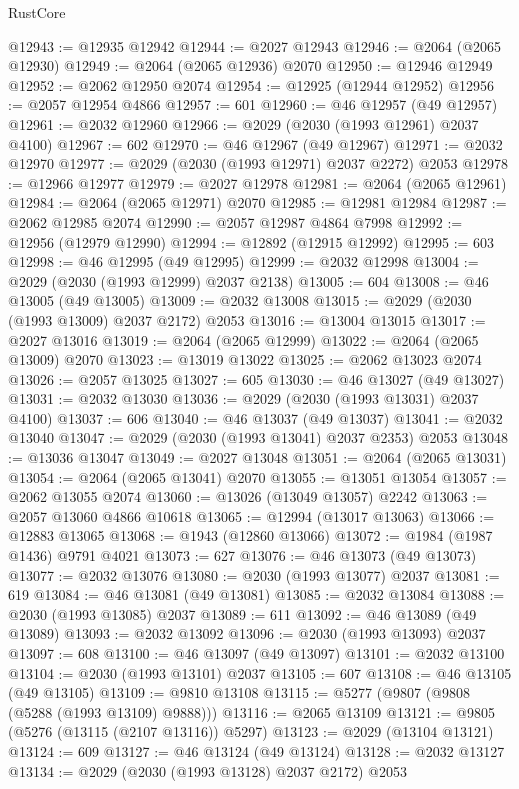 \begin{lexlean}{RustCore}
\begin{coremodule}
@12943 := @12935 @12942
@12944 := @2027 @12943
@12946 := @2064 (@2065 @12930)
@12949 := @2064 (@2065 @12936) @2070
@12950 := @12946 @12949
@12952 := @2062 @12950 @2074
@12954 := @12925 (@12944 @12952)
@12956 := @2057 @12954 @4866
@12957 := 601
@12960 := @46 @12957 (@49 @12957)
@12961 := @2032 @12960
@12966 := @2029 (@2030 (@1993 @12961) @2037 @4100)
@12967 := 602
@12970 := @46 @12967 (@49 @12967)
@12971 := @2032 @12970
@12977 := @2029 (@2030 (@1993 @12971) @2037 @2272) @2053
@12978 := @12966 @12977
@12979 := @2027 @12978
@12981 := @2064 (@2065 @12961)
@12984 := @2064 (@2065 @12971) @2070
@12985 := @12981 @12984
@12987 := @2062 @12985 @2074
@12990 := @2057 @12987 @4864 @7998
@12992 := @12956 (@12979 @12990)
@12994 := @12892 (@12915 @12992)
@12995 := 603
@12998 := @46 @12995 (@49 @12995)
@12999 := @2032 @12998
@13004 := @2029 (@2030 (@1993 @12999) @2037 @2138)
@13005 := 604
@13008 := @46 @13005 (@49 @13005)
@13009 := @2032 @13008
@13015 := @2029 (@2030 (@1993 @13009) @2037 @2172) @2053
@13016 := @13004 @13015
@13017 := @2027 @13016
@13019 := @2064 (@2065 @12999)
@13022 := @2064 (@2065 @13009) @2070
@13023 := @13019 @13022
@13025 := @2062 @13023 @2074
@13026 := @2057 @13025
@13027 := 605
@13030 := @46 @13027 (@49 @13027)
@13031 := @2032 @13030
@13036 := @2029 (@2030 (@1993 @13031) @2037 @4100)
@13037 := 606
@13040 := @46 @13037 (@49 @13037)
@13041 := @2032 @13040
@13047 := @2029 (@2030 (@1993 @13041) @2037 @2353) @2053
@13048 := @13036 @13047
@13049 := @2027 @13048
@13051 := @2064 (@2065 @13031)
@13054 := @2064 (@2065 @13041) @2070
@13055 := @13051 @13054
@13057 := @2062 @13055 @2074
@13060 := @13026 (@13049 @13057) @2242
@13063 := @2057 @13060 @4866 @10618
@13065 := @12994 (@13017 @13063)
@13066 := @12883 @13065
@13068 := @1943 (@12860 @13066)
@13072 := @1984 (@1987 @1436) @9791 @4021
@13073 := 627
@13076 := @46 @13073 (@49 @13073)
@13077 := @2032 @13076
@13080 := @2030 (@1993 @13077) @2037
@13081 := 619
@13084 := @46 @13081 (@49 @13081)
@13085 := @2032 @13084
@13088 := @2030 (@1993 @13085) @2037
@13089 := 611
@13092 := @46 @13089 (@49 @13089)
@13093 := @2032 @13092
@13096 := @2030 (@1993 @13093) @2037
@13097 := 608
@13100 := @46 @13097 (@49 @13097)
@13101 := @2032 @13100
@13104 := @2030 (@1993 @13101) @2037
@13105 := 607
@13108 := @46 @13105 (@49 @13105)
@13109 := @9810 @13108
@13115 := @5277 (@9807 (@9808 (@5288 (@1993 @13109) @9888)))
@13116 := @2065 @13109
@13121 := @9805 (@5276 (@13115 (@2107 @13116)) @5297)
@13123 := @2029 (@13104 @13121)
@13124 := 609
@13127 := @46 @13124 (@49 @13124)
@13128 := @2032 @13127
@13134 := @2029 (@2030 (@1993 @13128) @2037 @2172) @2053

\end{coremodule}
\end{lexlean}
